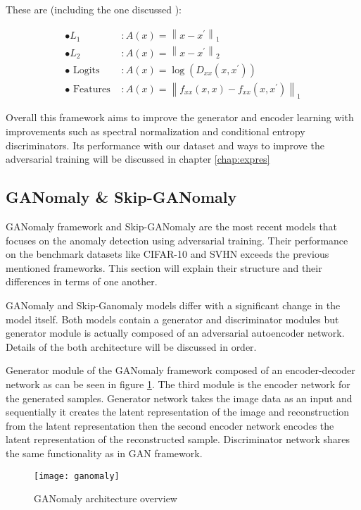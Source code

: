 These are (including the one discussed ):

\begin{equation}
\begin{aligned} \bullet L_{1} & : A(x)=\left\|x-x^{\prime}\right\|_{1} \\ \bullet L_{2} & : A(x)=\left\|x-x^{\prime}\right\|_{2} \\ \bullet \text { Logits } & : A(x)=\log \left(D_{x x}\left(x, x^{\prime}\right)\right) \\ \bullet \text { Features } & : A(x)=\left\|f_{x x}(x, x)-f_{x x}\left(x, x^{\prime}\right)\right\|_{1} \end{aligned}
\end{equation}

Overall this framework aims to improve the generator and encoder learning with improvements such as spectral
normalization and conditional entropy discriminators. Its performance with our dataset and ways to
improve the adversarial training will be discussed in chapter \ref{chap:expres}

\subsection{GANomaly \& Skip-GANomaly}
\label{sec:ganomaly}

GANomaly framework \cite{Akay2018GANomalySA} and Skip-GANomaly \cite{Akay2019SkipGANomalySC} are the
most recent models that focuses on the anomaly detection using adversarial training. 
Their performance on the benchmark datasets like CIFAR-10
\cite{cifar10} and SVHN \cite{Netzer2011ReadingDI} exceeds the previous mentioned frameworks. This
section will explain their structure and their differences in terms of one another.

GANomaly and Skip-Ganomaly models differ with a significant change in the model itself. Both 
models contain a generator and discriminator modules but generator module is actually composed of an
adversarial autoencoder network. Details of the both architecture will be discussed in order.

Generator module of the GANomaly framework composed of an encoder-decoder network as can be seen in
figure \ref{fig:ganomaly_model}. The third module is the encoder network for the generated samples.
Generator network takes the image data as an input and sequentially it creates the latent
representation of the image and reconstruction from the latent representation then the second
encoder network encodes the latent representation of the reconstructed sample. Discriminator network
shares the same functionality as in GAN framework. \cite{Goodfellow:2014:GAN:2969033.2969125}
\begin{figure}[h!]
	\centering
	\texttt{[image: ganomaly]}
    \caption{GANomaly architecture overview}
    \label{fig:ganomaly_model}
\end{figure}

